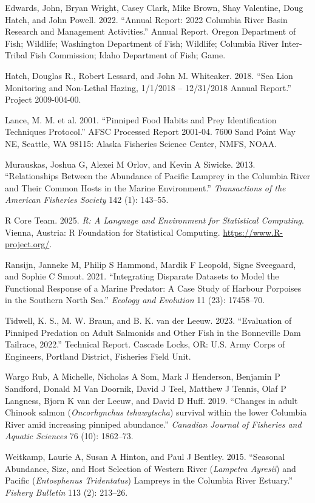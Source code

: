 \documentclass[
]{article}
\newlength{\cslhangindent}
\newenvironment{CSLReferences}[2] %
 {\begin{list}{}{%
  \setlength{\itemindent}{0pt}
  \setlength{\leftmargin}{0pt}
  \setlength{\parsep}{0pt}
  \ifodd #1
   \setlength{\leftmargin}{\cslhangindent}
   \setlength{\itemindent}{-1\cslhangindent}
  \fi
  \setlength{\itemsep}{#2\baselineskip}}}
 {\end{list}}
\begin{document}
\begin{CSLReferences}{1}{0}
Edwards, John, Bryan Wright, Casey Clark, Mike Brown, Shay Valentine,
Doug Hatch, and John Powell. 2022. {``Annual Report: 2022 Columbia River
Basin Research and Management Activities.''} Annual Report. Oregon
Department of Fish; Wildlife; Washington Department of Fish; Wildlife;
Columbia River Inter-Tribal Fish Commission; Idaho Department of Fish;
Game.

Hatch, Douglas R., Robert Lessard, and John M. Whiteaker. 2018. {``Sea
Lion Monitoring and Non-Lethal Hazing, 1/1/2018 -- 12/31/2018 Annual
Report.''} Project 2009-004-00.

Lance, M. M. et al. 2001. {``Pinniped Food Habits and Prey
Identification Techniques Protocol.''} AFSC Processed Report 2001-04.
7600 Sand Point Way NE, Seattle, WA 98115: Alaska Fisheries Science
Center, NMFS, NOAA.

Murauskas, Joshua G, Alexei M Orlov, and Kevin A Siwicke. 2013.
{``Relationships Between the Abundance of {P}acific Lamprey in the
{C}olumbia River and Their Common Hosts in the Marine Environment.''}
\emph{Transactions of the American Fisheries Society} 142 (1): 143--55.

R Core Team. 2025. \emph{R: A Language and Environment for Statistical
Computing}. Vienna, Austria: R Foundation for Statistical Computing.
\url{https://www.R-project.org/}.

Ransijn, Janneke M, Philip S Hammond, Mardik F Leopold, Signe Sveegaard,
and Sophie C Smout. 2021. {``Integrating Disparate Datasets to Model the
Functional Response of a Marine Predator: A Case Study of Harbour
Porpoises in the Southern North Sea.''} \emph{Ecology and Evolution} 11
(23): 17458--70.

Tidwell, K. S., M. W. Braun, and B. K. van der Leeuw. 2023.
{``{Evaluation of Pinniped Predation on Adult Salmonids and Other Fish
in the Bonneville Dam Tailrace, 2022}.''} Technical Report. Cascade
Locks, OR: U.S. Army Corps of Engineers, Portland District, Fisheries
Field Unit.

Wargo Rub, A Michelle, Nicholas A Som, Mark J Henderson, Benjamin P
Sandford, Donald M Van Doornik, David J Teel, Matthew J Tennis, Olaf P
Langness, Bjorn K van der Leeuw, and David D Huff. 2019. {``{Changes in
adult Chinook salmon (\emph{Oncorhynchus tshawytscha}) survival within
the lower Columbia River amid increasing pinniped abundance}.''}
\emph{Canadian Journal of Fisheries and Aquatic Sciences} 76 (10):
1862--73.

Weitkamp, Laurie A, Susan A Hinton, and Paul J Bentley. 2015.
{``Seasonal Abundance, Size, and Host Selection of {W}estern {R}iver
(\emph{Lampetra Ayresii}) and {P}acific (\emph{Entosphenus Tridentatus})
Lampreys in the {C}olumbia {R}iver Estuary.''} \emph{Fishery Bulletin}
113 (2): 213--26.

\end{CSLReferences}
\end{document}
